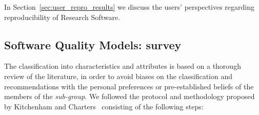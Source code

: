 In Section~\ref{sec:user_repro_results} we discuss the users' perspectives regarding reproducibility of Research Software.

\subsection{Software Quality Models: survey}
\label{subsec:sqm_survey}

The classification into characteristics and attributes is based on a thorough review of the literature, in order to avoid biases on the classification and recommendations with the personal preferences or pre-established beliefs of the members of the \textit{sub-group}. We followed the protocol and methodology proposed by Kitchenham and Charters~\cite{keele2007guidelines} consisting of the following steps:


